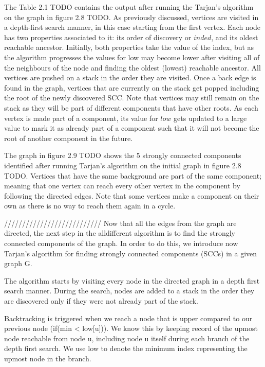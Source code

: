 \documentclass{l4proj}
\begin{document}
\noindent The Table 2.1 TODO contains the output after running the Tarjan’s algorithm on the graph in figure 2.8 TODO. As previously discussed, vertices are visited in a depth-first search manner, in this case starting from the first vertex. Each node has two properties associated to it: its order of discovery or $inded$, and its oldest reachable ancestor. Initially, both properties take the value of the index, but as the algorithm progresses the values for low may become lower after visiting all of the neighbours of the node and finding the oldest (lowest) reachable ancestor. All vertices are pushed on a stack in the order they are visited. Once a back edge is found in the graph, vertices that are currently on the stack get popped including the root of the newly discovered SCC. Note that vertices may still remain on the stack as they will be part of different components that have other roots. As each vertex is made part of a component, its value for $low$ gets updated to a large value to mark it as already part of a component such that it will not become the root of another component in the future.

\noindent The graph in figure 2.9 TODO shows the 5 strongly connected components identified after running Tarjan’s algorithm on the initial graph in figure 2.8 TODO. Vertices that have the same background are part of the same component; meaning that one vertex can reach every other vertex in the component by following the directed edges. Note that some vertices make a component on their own as there is no way to reach them again in a cycle.

\iffalse ///////////////////////////
Now that all the edges from the graph are directed, the next step in the alldifferent algorithm is to find the strongly connected components of the graph. In order to do this, we introduce now Tarjan’s algorithm for finding strongly connected components  (SCCs) in a given graph G.

\noindent The algorithm starts by visiting every node in the directed graph in a depth first search manner. During the search, nodes are added to a stack in the order they are discovered only if they were not already part of the stack. 

\noindent Backtracking is triggered when we reach a node that is upper compared to our previous node (if(min < low[u])).  We know this by keeping record of the upmost node reachable from node u, including node u itself during each branch of the depth first search. We use low to denote the minimum index representing the upmost node in the branch.
\end{document}
